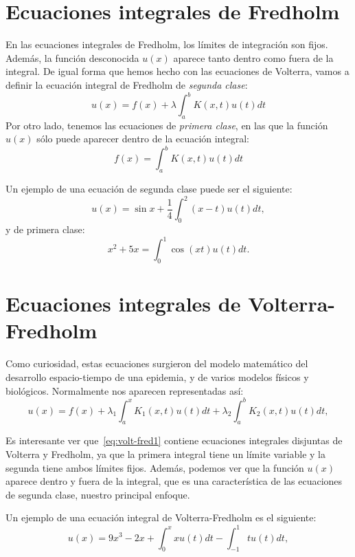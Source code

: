\section{Ecuaciones integrales de Fredholm}
\begin{definicion}
	En las ecuaciones integrales de Fredholm, los límites de integración son fijos. Además, la función desconocida $u(x)$ aparece tanto dentro como fuera de la integral. De igual forma que hemos hecho con las ecuaciones de Volterra, vamos a definir la ecuación integral de Fredholm de \textit{segunda clase}:
	\begin{equation}\label{}
		u(x) = f(x) + \lambda \int_a^b K(x,t)u(t)dt
	\end{equation}
	Por otro lado, tenemos las ecuaciones de \textit{primera clase}, en las que la función $u(x)$ sólo puede aparecer dentro de la ecuación integral:
	\begin{equation}\label{}
		f(x) = \int_a^b K(x,t)u(t)dt
	\end{equation}
\end{definicion}
\begin{ejemplo}
	Un ejemplo de una ecuación de segunda clase puede ser el siguiente:
	\begin{equation}\label{}
		u(x) = \sin x + \dfrac{1}{4}\int_{0}^2 (x-t)u(t)dt,
	\end{equation}
	y de primera clase:
	\begin{equation}\label{}
		{x^2} + 5x = \int_0^1 \cos(xt)u(t)dt.
	\end{equation}
\end{ejemplo}

\section{Ecuaciones integrales de Volterra-Fredholm}
Como curiosidad, estas ecuaciones surgieron del modelo matemático del desarrollo espacio-tiempo de una epidemia, y de varios modelos físicos y biológicos. Normalmente nos aparecen representadas así:
\begin{equation}\label{eq:volt-fred1}
	u(x) = f(x) + \lambda_1 \int_a^x K_1(x,t)u(t)dt + \lambda_2 \int_a^b K_2(x,t)u(t)dt,
\end{equation}

Es interesante ver que~\eqref{eq:volt-fred1} contiene ecuaciones integrales disjuntas de Volterra y Fredholm, ya que la primera integral tiene un límite variable y la segunda tiene ambos límites fijos. Además, podemos ver que la función $u(x)$ aparece dentro y fuera de la integral, que es una característica de las ecuaciones de segunda clase, nuestro principal enfoque.
\begin{ejemplo}
	Un ejemplo de una ecuación integral de Volterra-Fredholm es el siguiente:
	\begin{equation}\label{}
		u(x) = 9x^3 - 2x + \int_0^x xu(t)dt - \int_{-1}^1 tu(t)dt,
	\end{equation}
\end{ejemplo}
